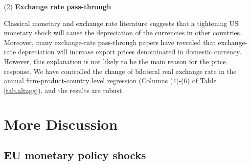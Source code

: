 (2) \textbf{Exchange rate pass-through} 

Classical monetary and exchange rate literature suggests that a tightening US monetary shock will cause the depreciation of the currencies in other countries. Moreover, many exchange-rate pass-through papers have revealed that exchange-rate depreciation will increase export prices denominated in domestic currency. However, this explanation is not likely to be the main reason for the price response. We have controlled the change of bilateral real exchange rate in the annual firm-product-country level regression (Columns (4)-(6) of Table \ref{tab.altagg}), and the results are robust.

\newpage
\section{More Discussion}

\subsection{EU monetary policy shocks}

